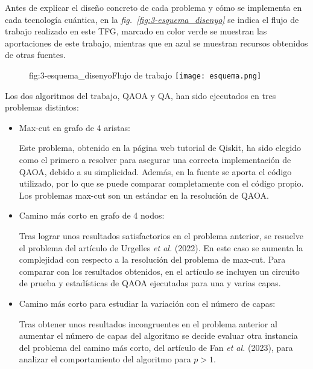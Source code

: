 Antes de explicar el diseño concreto de cada problema y cómo se implementa en cada tecnología cuántica, en la \textit{fig.~\ref{fig:3-esquema_disenyo}} se indica el flujo de trabajo realizado en este TFG, marcado en color verde se muestran las aportaciones de este trabajo, mientras que en azul se muestran recursos obtenidos de otras fuentes.

\begin{figure}[Flujo de trabajo]{fig:3-esquema_disenyo}{Flujo de trabajo}
  \centering
  \texttt{[image: esquema.png]}
\end{figure}

Los dos algoritmos del trabajo, QAOA y QA, han sido ejecutados en tres problemas distintos:

\begin{itemize}
\item Max-cut en grafo de 4 aristas:

  Este problema, obtenido en la página web tutorial de Qiskit\cite{qiskit_tutorial_antiguo}, ha sido elegido como el primero a resolver para asegurar una correcta implementación de QAOA, debido a su simplicidad.
  Además, en la fuente se aporta el código utilizado, por lo que se puede comparar completamente con el código propio.
  Los problemas max-cut son un estándar en la resolución de QAOA.

\item Camino más corto en grafo de 4 nodos:

  Tras lograr unos resultados satisfactorios en el problema anterior, se resuelve el problema del artículo de Urgelles \textit{et al.} (2022)\cite{multi-objective_routing_optimization}.
  En este caso se aumenta la complejidad con respecto a la resolución del problema de max-cut.
  Para comparar con los resultados obtenidos, en el artículo se incluyen un circuito de prueba y estadísticas de QAOA ejecutadas para una y varias capas.

\item Camino más corto para estudiar la variación con el número de capas:

  Tras obtener unos resultados incongruentes en el problema anterior al aumentar el número de capas del algoritmo se decide evaluar otra instancia del problema del camino más corto, del artículo de Fan \textit{et al.} (2023)\cite{solving_shortest_path_with_qaoa}, para analizar el comportamiento del algoritmo para $p > 1$.
\end{itemize}

